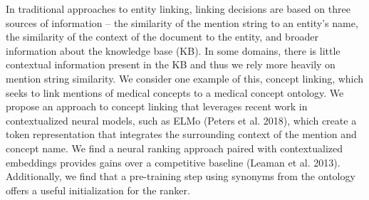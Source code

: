 In traditional approaches to entity linking, linking decisions are based on three sources of information -- the similarity of the mention string to an entity's name, the similarity of the context of the document to the entity, and broader information about the knowledge base (KB). In some domains, there is little contextual information present in the KB and thus we rely more heavily on mention string similarity. We consider one example of this, concept linking, which seeks to link mentions of medical concepts to a medical concept ontology. We propose an approach to concept linking that leverages recent work in contextualized neural models, such as ELMo (Peters et al. 2018), which create a token representation that integrates the surrounding context of the mention and concept name. We find a neural ranking approach paired with contextualized embeddings provides gains over a competitive baseline (Leaman et al. 2013).  Additionally, we find that a pre-training step using synonyms from the ontology offers a useful initialization for the ranker.
